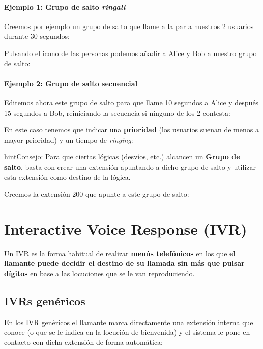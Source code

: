 \documentclass[letterpaper,10pt,spanish]{sphinxmanual}
\begin{document}
\paragraph{Ejemplo 1: Grupo de salto \emph{ringall}}

Creemos por ejemplo un grupo de salto que llame a la par a nuestros 2 usuarios durante 30 segundos:

\noindent{}

Pulsando el icono de las personas podemos añadir a Alice y Bob a nuestro grupo de salto:

\noindent{}
\paragraph{Ejemplo 2: Grupo de salto secuencial}

Editemos ahora este grupo de salto para que llame 10 segundos a Alice y después 15 segundos a Bob, reiniciando la secuencia si ninguno de los 2 contesta:

\noindent{}

En este caso tenemos que indicar una \textbf{prioridad} (los usuarios suenan de menos a mayor prioridad) y un tiempo de \emph{ringing}:

\noindent{}

\begin{notice}{hint}{Consejo:}
Para que ciertas lógicas (desvíos, etc.) alcancen un \textbf{Grupo de salto}, basta con crear una extensión apuntando a dicho grupo de salto y utilizar esta extensión como destino de la lógica.
\end{notice}

Creemos la extensión 200 que apunte a este grupo de salto:

\noindent{}


\section{Interactive Voice Response (IVR)}
\label{pbx_features/ivrs::doc}\label{pbx_features/ivrs:interactive-voice-response-ivr}
Un IVR es la forma habitual de realizar \textbf{menús telefónicos} en los que \textbf{el llamante puede decidir el destino de su llamada sin más que pulsar dígitos} en base a las locuciones que se le van reproduciendo.


\subsection{IVRs genéricos}
\label{pbx_features/ivrs:generic-ivrs}\label{pbx_features/ivrs:ivrs-genericos}
En los IVR genéricos el llamante marca directamente una extensión interna que conoce (o que se le indica en la locución de bienvenida) y el sistema le pone en contacto con dicha extensión de forma automática:
\end{document}
